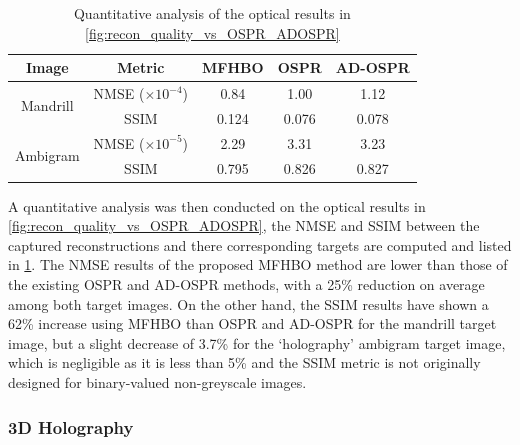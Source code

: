 	\begin{table}[H]
	\centering
	\begin{tabular}{|c|c|c|c|c|}
	\hline
	\textbf{Image}              & \textbf{Metric}    & \textbf{MFHBO}  & \textbf{OSPR}  & \textbf{AD-OSPR} \\ \hline
	\multirow{2}{*}{Mandrill}   & NMSE ($\times 10^{-4}$) & 0.84      & 1.00           & 1.12             \\ \cline{2-5}
								& SSIM               & 0.124          & 0.076          & 0.078            \\ \hline
	\multirow{2}{*}{Ambigram}   & NMSE ($\times 10^{-5}$) & 2.29      & 3.31           & 3.23             \\ \cline{2-5}
								& SSIM               & 0.795          & 0.826          & 0.827            \\ \hline
	\end{tabular}
	\caption{Quantitative analysis of the optical results in \cref{fig:recon_quality_vs_OSPR_ADOSPR}}
	\label{tab:quantitative_vs_OSPR_ADOSPR}
	\end{table}

	A quantitative analysis was then conducted on the optical results in \cref{fig:recon_quality_vs_OSPR_ADOSPR}, the NMSE and SSIM between the captured reconstructions and there corresponding targets are computed and listed in \cref{tab:quantitative_vs_OSPR_ADOSPR}. The NMSE results of the proposed MFHBO method are lower than those of the existing OSPR and AD-OSPR methods, with a 25\% reduction on average among both target images. On the other hand, the SSIM results have shown a 62\% increase using MFHBO than OSPR and AD-OSPR for the mandrill target image, but a slight decrease of 3.7\% for the `holography' ambigram target image, which is negligible as it is less than 5\% and the SSIM metric is not originally designed for binary-valued non-greyscale images.

\subsubsection{3D Holography}

